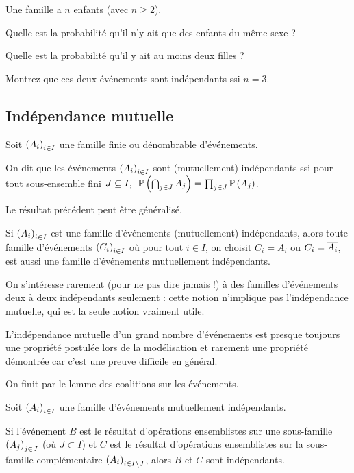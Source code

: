 \begin{exo}
Une famille a \(n\) enfants (avec \(n\geq2\)).

Quelle est la probabilité qu'il n'y ait que des enfants du même sexe ?

Quelle est la probabilité qu'il y ait au moins deux filles ?

Montrez que ces deux événements sont indépendants ssi \(n=3\).
\end{exo}

\subsection{Indépendance mutuelle}

\begin{defi}
Soit \(\left(A_i\right)_{i\in I}\) une famille finie ou dénombrable d'événements.

On dit que les événements \(\left(A_i\right)_{i\in I}\) sont (mutuellement) indépendants ssi pour tout sous-ensemble fini \(\quantifs{J\subset I}\proba{\biginter_{j\in J}A_j}=\prod_{j\in J}\proba{A_j}\).
\end{defi}

Le résultat précédent peut être généralisé.

\begin{prop}
Si \(\left(A_i\right)_{i\in I}\) est une famille d'événements (mutuellement) indépendants, alors toute famille d'événements \(\left(C_i\right)_{i\in I}\) où pour tout \(i\in I\), on choisit \(C_i=A_i\) ou \(C_i=\overline{A_i}\), est aussi une famille d'événements mutuellement indépendants.
\end{prop}

\begin{rem}
On s'intéresse rarement (pour ne pas dire jamais !) à des familles d'événements deux à deux indépendants seulement : cette notion n'implique pas l'indépendance mutuelle, qui est la seule notion vraiment utile.
\end{rem}

\begin{rem}
L'indépendance mutuelle d'un grand nombre d'événements est presque toujours une propriété postulée lors de la modélisation et rarement une propriété démontrée car c'est une preuve difficile en général.
\end{rem}

On finit par le lemme des coalitions sur les événements.

\begin{theo}
Soit \(\left(A_i\right)_{i\in I}\) une famille d'événements mutuellement indépendants.

Si l'événement \(B\) est le résultat d'opérations ensemblistes sur une sous-famille \(\left(A_j\right)_{j\in J}\) (où \(J\subset I\)) et \(C\) est le résultat d'opérations ensemblistes sur la sous-famille complémentaire \(\left(A_i\right)_{i\in I\setminus J}\), alors \(B\) et \(C\) sont indépendants.
\end{theo}
